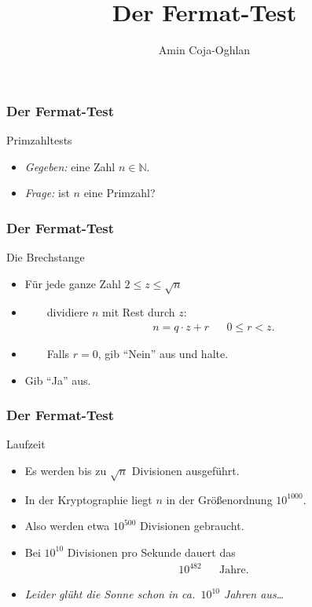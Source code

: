 \documentclass{beamer}
\title[Linadi]{Der Fermat-Test}
\author[Amin Coja-Oghlan]{Amin Coja-Oghlan}
\institute[Frankfurt]{JWGUFFM}
\date{}
\renewcommand{\emph}[1]{{\textcolor{solarizedRed}{\itshape #1}}}
\newcommand\NN{\mathbb N}
\renewcommand{\oe}{\"o}
\newcommand{\ue}{\"u}
\begin{document}
\frame[plain]{\titlepage}

\begin{frame}\frametitle{Der Fermat-Test}
	\begin{block}{Primzahltests}
		\begin{itemize}
			\item \emph{Gegeben:} eine Zahl $n\in\NN$.
			\item \emph{Frage:} ist $n$ eine Primzahl?
		\end{itemize}
	\end{block}
\end{frame}

\begin{frame}\frametitle{Der Fermat-Test}
	\begin{block}{Die Brechstange}
		\begin{itemize}
			\item F\ue r jede ganze Zahl $2\leq z\leq\sqrt n$
			\item $\qquad$dividiere $n$ mit Rest durch $z$:
				\begin{align*}
					n=q\cdot z+r&&0\leq r<z.
				\end{align*}
			\item $\qquad$Falls $r=0$, gib ``Nein'' aus und halte.
			\item Gib ``Ja'' aus.
		\end{itemize}
	\end{block}
\end{frame}

\begin{frame}\frametitle{Der Fermat-Test}
	\begin{block}{Laufzeit}
		\begin{itemize}
			\item Es werden bis zu $\sqrt n$ Divisionen ausgef\ue hrt.
			\item In der Kryptographie liegt $n$ in der Gr\oe\ss enordnung $10^{1000}$.
			\item Also werden etwa $10^{500}$ Divisionen gebraucht.
			\item Bei $10^{10}$ Divisionen pro Sekunde dauert das
				\begin{align*}
					10^{482}&&\mbox{Jahre.}
				\end{align*}
			\item \itshape Leider gl\ue ht die Sonne schon in ca.~$10^{10}$ Jahren aus\dots
		\end{itemize}
	\end{block}
\end{frame}
\end{document}

